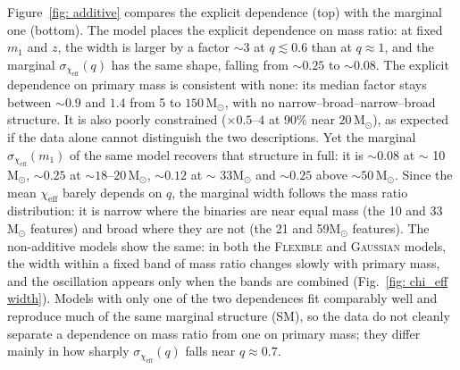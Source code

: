 \documentclass[%
    aps,
    prl,
    reprint,
    superscriptaddress,
    nolongbibliography,
    nobibnotes,
    nofootinbib,
    linenumbers,
    amsmath,amssymb,
]{revtex4-2}
\newcommand{\Msun}{\ensuremath{\mathrm{M}_{\odot}}}
\newcommand{\chieff}{\ensuremath{\chi_{\mathrm{eff}}}}
\newcommand{\red}[1]{{\color{Red} #1}}
\newcommand{\flexiblespins}{\textsc{Flexible}\xspace}
\newcommand{\gaussianspins}{\textsc{Gaussian}\xspace}
\newcommand{\featTen}{10\xspace}
\newcommand{\featTwenty}{21\xspace}
\newcommand{\featThirtyFive}{33\xspace}
\newcommand{\featSixty}{59\xspace}
\begin{document}
Figure~\ref{fig: additive} compares the explicit dependence (top) with the marginal one (bottom). The model places the explicit dependence on mass ratio: at fixed $m_1$ and $z$, the width is larger by a factor $\sim 3$ at $q \lesssim 0.6$ than at $q \approx 1$, and the marginal $\sigma_{\chieff}(q)$ has the same shape, falling from $\sim 0.25$ to $\sim 0.08$. The explicit dependence on primary mass is consistent with none: its median factor stays between $\sim 0.9$ and $1.4$ from 5 to $150\,\Msun$, with no narrow--broad--narrow--broad structure. It is also poorly constrained ($\times 0.5$--$4$ at 90\% near $20\,\Msun$), as expected if the data alone cannot distinguish the two descriptions. Yet the marginal $\sigma_{\chieff}(m_1)$ of the same model recovers that structure in full: it is $\sim 0.08$ at $\sim$ \featTen $\Msun$, $\sim 0.25$ at $\sim 18$--$20\,\Msun$, $\sim 0.12$ at $\sim$ \featThirtyFive $\Msun$ and $\sim 0.25$ above $\sim 50\,\Msun$. Since the mean $\chieff$ barely depends on $q$, the marginal width follows the mass ratio distribution: it is narrow where the binaries are near equal mass (the \featTen and \featThirtyFive $\Msun$ features) and broad where they are not (the \featTwenty and \featSixty $\Msun$ features). The non-additive models show the same: in both the \flexiblespins and \gaussianspins models, the width within a fixed band of mass ratio changes slowly with primary mass, and the oscillation appears only when the bands are combined (Fig.~\ref{fig: chi_eff width}). \red{Models with only one of the two dependences fit comparably well and reproduce much of the same marginal structure (SM), so the data do not cleanly separate a dependence on mass ratio from one on primary mass; they differ mainly in how sharply $\sigma_{\chieff}(q)$ falls near $q \approx 0.7$.}
\end{document}
